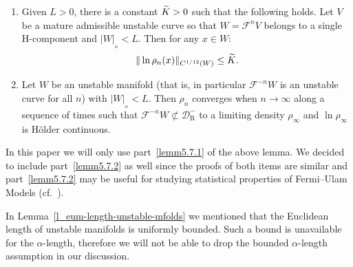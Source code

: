 \documentclass[AHL, Unicode, longabstracts,published]{cedram}
\newcommand{\cm}{\mathcal{F}}
\newcommand{\cell}{\mathcal{D}}
\newcommand{\recoPrivate}{\mathrm{R}}
\newcommand{\reco}{{\cell^-_{\recoPrivate}}}
\newcommand{\adm}{_{\alpha^{+}}}
\newcommand{\admName}{\alpha^{+}}
\newcommand{\tK}{\tilde{K}}
\renewcommand{\admName}{\alpha}
\renewcommand{\adm}{_{\alpha}}
\newcommand*{\relabel}{\renewcommand{\labelenumi}{(\theenumi)}}
\newcommand*{\alphenumi}{\renewcommand*{\theenumi}{\alph{enumi}}\relabel}
\let\oldtilde\tilde
\renewcommand*{\tilde}[1]{\mathchoice{\widetilde{#1}}{\widetilde{#1}}{\oldtilde{#1}}{\oldtilde{#1}}}
\begin{document}
\begin{lemm}\label{LmBD}\leavevmode
\begin{enumerate}\alphenumi
\item\label{lemm5.7.1} Given $L > 0$, there is a constant $\tK > 0$ such that the following holds. Let $V$ be a mature admissible unstable curve so that $W = \cm^{n}V$ belongs to a single H-component and $|W|_{\adm} < L$. Then for any $x\in W$:
\begin{align*}
\|\ln \rho_n(x)\|_{C^{1/12}(W)}\leq \tK.
\end{align*}
\item\label{lemm5.7.2} Let $W$ be an unstable manifold (that is, in particular $\cm ^{-n}W$ is an unstable curve for all $n$) with $|W|_{\adm} < L.$ Then $\rho_n$ converges when $n\to\infty$ along a sequence of times such that $\cm^{-n} W\not\subset \reco$ to a limiting density $\rho_\infty$ and $\ln\rho_\infty$ is H\"older continuous.
\end{enumerate}
\end{lemm}


\begin{rema}
In this paper we will only use part~\eqref{lemm5.7.1} of the above lemma. We decided to include part~\eqref{lemm5.7.2} as well since the proofs of both items are similar and part~\eqref{lemm5.7.2} may be useful for studying statistical properties of Fermi--Ulam Models (cf.~\cite[\S7]{ChM}).
\end{rema}
\begin{rema}
In Lemma~\ref{l_eum-length-unstable-mfolds} we mentioned that the Euclidean length of unstable manifolds is uniformly bounded. Such a bound is unavailable for the $\admName$-length, therefore we will not be able to drop the bounded $\admName$-length assumption in our discussion.
\end{rema}
\end{document}
